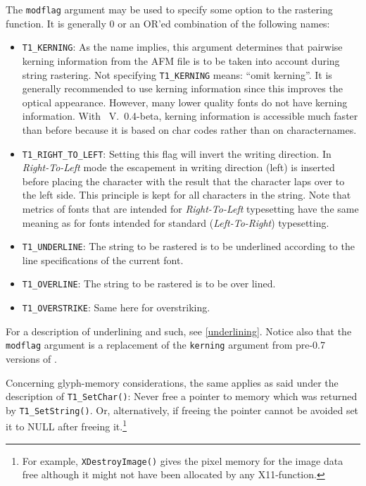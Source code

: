 The \verb+modflag+ argument may be used to specify some option to the
rastering function. It is generally 0 or an OR'ed combination of the following
names:
\begin{itemize}
\item \verb+T1_KERNING+: As the name implies, this argument
  determines that pairwise kerning information from the AFM file is to be taken
  into account during string rastering. Not specifying \verb+T1_KERNING+ 
  means: ``omit kerning''. It is generally
  recommended to use kerning information since this improves the optical
  appearance. However, many lower quality fonts do not have kerning
  information.  With \tonelib\ V.\ 0.4-beta, kerning information is accessible
  much faster than before because it is based on char codes rather than on
  characternames.
\item \verb+T1_RIGHT_TO_LEFT+: Setting this flag will invert the writing
  direction. In {\em Right-To-Left} mode the escapement in writing direction
  (left) is inserted before placing the character with the result that the
  character laps over to the left side. This principle is kept for all
  characters in the string. Note that metrics of fonts that are intended for
  {\em Right-To-Left} typesetting have the same meaning as for fonts intended
  for standard ({\em Left-To-Right}) typesetting.
\item \verb+T1_UNDERLINE+: The string to be rastered is to be underlined
  according to the line specifications of the current font. 
\item \verb+T1_OVERLINE+: The string to be rastered is to be over lined.
\item \verb+T1_OVERSTRIKE+: Same here for overstriking. 
\end{itemize}
For a description of underlining and such, see \ref{underlining}. Notice also
that the \verb+modflag+ argument is a replacement of the \verb+kerning+
argument from pre-0.7 versions of \tonelib.

Concerning glyph-memory considerations, the same applies as said under
the description of \verb+T1_SetChar()+: Never free a pointer to memory
which was returned by \verb+T1_SetString()+. Or, alternatively, if freeing
the pointer cannot be avoided set it to NULL after freeing it.\footnote{For
  example, {\tt XDestroyImage()} gives the pixel memory for the image
  data free although it might not have been allocated by any X11-function.} 

